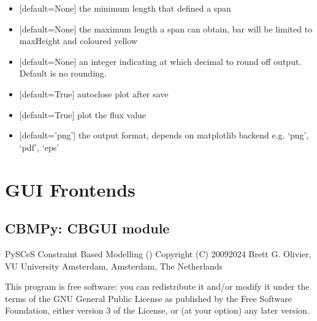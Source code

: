 \documentclass[letterpaper,12pt,english]{sphinxmanual}
\begin{document}
\begin{fulllineitems}
\begin{itemize}
\item {} 
\sphinxAtStartPar
{} {[}default=None{]} the minimum length that defined a span

\item {} 
\sphinxAtStartPar
{} {[}default=None{]} the maximum length a span can obtain, bar will be limited to maxHeight and coloured yellow

\item {} 
\sphinxAtStartPar
{} {[}default=None{]} an integer indicating at which decimal to round off output. Default is no rounding.

\item {} 
\sphinxAtStartPar
{} {[}default=True{]} autoclose plot after save

\item {} 
\sphinxAtStartPar
{} {[}default=True{]} plot the flux value

\item {} 
\sphinxAtStartPar
{} {[}default=’png’{]} the output format, depends on matplotlib backend e.g. ‘png’, ‘pdf’, ‘eps’

\end{itemize}

\end{fulllineitems}



\section{GUI Frontends}
\label{\detokenize{api/visualization:gui-frontends}}

\subsection{CBMPy: CBGUI module}
\label{\detokenize{api/visualization:cbmpy-cbgui-module}}\label{\detokenize{api/visualization:module-cbmpy.CBGUI}}
\sphinxAtStartPar
PySCeS Constraint Based Modelling ()
Copyright (C) 2009\sphinxhyphen{}2024 Brett G. Olivier, VU University Amsterdam, Amsterdam, The Netherlands

\sphinxAtStartPar
This program is free software: you can redistribute it and/or modify
it under the terms of the GNU General Public License as published by
the Free Software Foundation, either version 3 of the License, or
(at your option) any later version.
\end{document}

